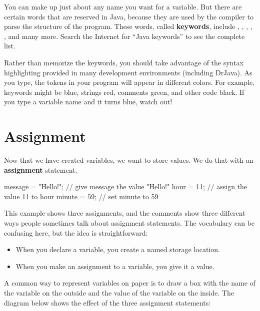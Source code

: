 You can make up just about any name you want for a variable.
But there are certain words that are reserved in Java, because they are used by the compiler to parse the structure of the program.
These words, called {\bf keywords}, include , , , , , and many more.
Search the Internet for ``Java keywords'' to see the complete list.


Rather than memorize the keywords, you should take advantage of the syntax highlighting provided in many development environments (including DrJava).
As you type, the tokens in your program will appear in different colors.
For example, keywords might be blue, strings red, comments green, and other code black.
If you type a variable name and it turns blue, watch out!


\section{Assignment}


Now that we have created variables, we want to store values.
We do that with an {\bf assignment} statement.

\begin{code}
    message = "Hello!";  // give message the value "Hello!"
    hour = 11;           // assign the value 11 to hour
    minute = 59;         // set minute to 59
\end{code}

This example shows three assignments, and the comments show three different ways people sometimes talk about assignment statements.
The vocabulary can be confusing here, but the idea is straightforward:

\begin{itemize}
\item When you declare a variable, you create a named storage location.
\item When you make an assignment to a variable, you give it a value.
\end{itemize}

A common way to represent variables on paper is to draw a box with the name of the variable on the outside and the value of the variable on the inside.
The diagram below shows the effect of the three assignment statements:

